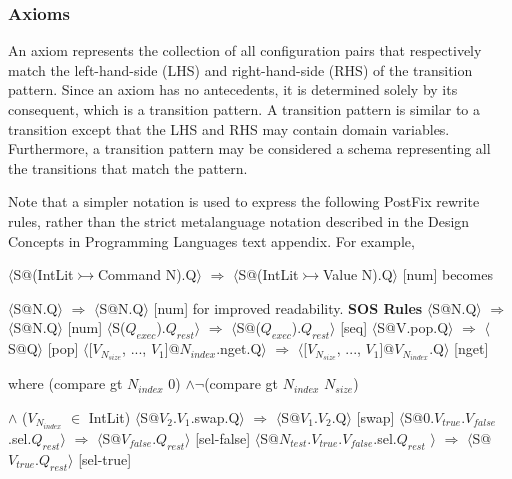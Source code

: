 \documentclass[a4paper,11pt]{article}
\begin{document}
\subsubsection{Axioms}
\begin{par} An axiom represents the collection of all configuration pairs that respectively match the left-hand-side (LHS) and right-hand-side (RHS) of the transition pattern. Since an axiom has no antecedents, it is determined solely by its consequent, which is a transition pattern. A transition pattern is similar to a transition except that the LHS and RHS may contain domain variables. Furthermore, a transition pattern may be considered a schema representing all the transitions that match the pattern. \end{par}
\begin{par} Note that a simpler notation is used to express the following PostFix rewrite rules, rather than the strict metalanguage notation described in the Design Concepts in Programming Languages text appendix. For example, \end{par}
\begin{par}$\langle$S@(IntLit$\rightarrowtail$Command N).Q$\rangle$ $\Rightarrow$ $\langle$S@(IntLit$\rightarrowtail$Value N).Q$\rangle$ \hfill [num] \newline
becomes \end{par}
\begin{par}$\langle$S@N.Q$\rangle$ $\Rightarrow$ $\langle$S@N.Q$\rangle$ \hfill [num] \newline
for improved readability. \vspace{5mm} \newline
\textbf{SOS Rules} \newline
$\langle$S@N.Q$\rangle$ $\Rightarrow$ $\langle$S@N.Q$\rangle$ \hfill [num] \newline
$\langle$S($Q_{exec}$).$Q_{rest}$$\rangle$ $\Rightarrow$ $\langle$S@($Q_{exec}$).$Q_{rest}$$\rangle$ \hfill [seq] \newline
$\langle$S@V.pop.Q$\rangle$ $\Rightarrow$ $\langle$S@Q$\rangle$ \hfill [pop] \newline
$\langle$[$V_{N_{size}}$, ..., $V_1$]@$N_{index}$.nget.Q$\rangle$ $\Rightarrow$ $\langle$[$V_{N_{size}}$, ..., $V_1$]@$V_{N_{index}}$.Q$\rangle$ \hfill [nget] \end{par}
\begin{par} where (compare gt $N_{index}$ 0) $\wedge$$\neg$(compare gt $N_{index}$ $N_{size}$) \end{par} \begin{par} $\wedge$ ($V_{N_{index}}$ $\in$ IntLit) \newline
$\langle$S@$V_2$.$V_1$.swap.Q$\rangle$ $\Rightarrow$ $\langle$S@$V_1$.$V_2$.Q$\rangle$ \hfill [swap] \newline
$\langle$S@0.$V_{true}$.$V_{false}$.sel.$Q_{rest}$$\rangle$ $\Rightarrow$ $\langle$S@$V_{false}$.$Q_{rest}$$\rangle$ \hfill [sel-false] \newline
$\langle$S@$N_{test}$.$V_{true}$.$V_{false}$.sel.$Q_{rest}$ $\rangle$ $\Rightarrow$ $\langle$S@$V_{true}$.$Q_{rest}$$\rangle$ \hfill [sel-true] \end{par}
\end{document}
